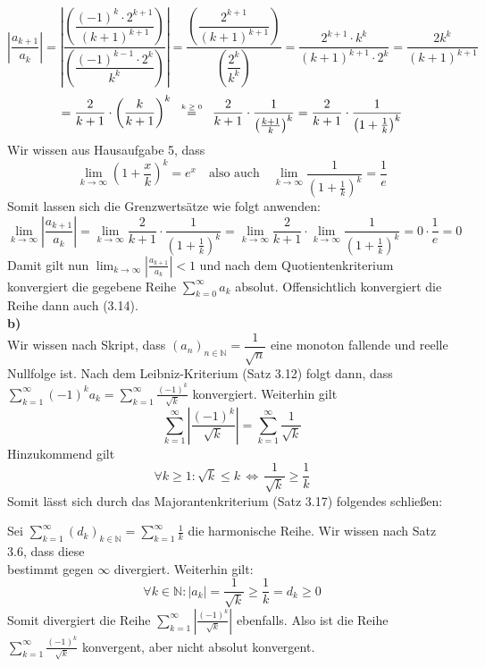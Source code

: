 \documentclass[a4paper,graphics,11pt]{article}
\newcommand{\up}[2]{\mathrel{\overset{\makebox[0pt]{\mbox{\normalfont\tiny #2}}}{#1}}}
\begin{document}
$$
    \left| \frac{a_{k+1}}{a_k}\right|
    = \left|\frac{\left(\dfrac{(-1)^k\cdot2^{k+1}}{(k+1)^{k+1}}\right)}{\left(\dfrac{(-1)^{k-1}\cdot 2^k}{k^k}\right)}\right|
    = \frac{\left(\dfrac{2^{k+1}}{(k+1)^{k+1}}\right)}{\left(\dfrac{2^k}{k^k}\right)}
    = \frac{2^{k+1}\cdot k^k}{(k+1)^{k+1} \cdot 2^k}
    = \frac{2k^k}{(k+1)^{k+1}}
$$$$
    =\frac{2}{k+1} \cdot \left(\frac{k}{k+1}\right)^k
    \quad\up{=}{$k\geq 0$}\quad \frac{2}{k+1} \cdot \frac{1}{\left(\frac{k+1}{k}\right)^k}
    = \frac{2}{k+1} \cdot \frac{1}{\left(1+\frac{1}{k}\right)^k}
$$
Wir wissen aus Hausaufgabe 5, dass
$$
    \lim_{k \to \infty} \left(1+\frac{x}{k}\right)^k = e^x\quad \text{also auch}\quad
    \lim_{k \to \infty} \frac{1}{\left(1+\frac{1}{k}\right)^k} = \frac{1}{e}
$$
Somit lassen sich die Grenzwertsätze wie folgt anwenden:
$$
    \lim_{k \to \infty} \left |\frac{a_{k+1}}{a_k}\right|
    = \lim_{k \to \infty} \frac{2}{k+1} \cdot \frac{1}{\left(1+\frac{1}{k}\right)^k}
    = \lim_{k \to \infty} \frac{2}{k+1} \cdot \lim_{k \to \infty} \frac{1}{\left(1+\frac{1}{k} \right)^k}
    = 0 \cdot \frac{1}{e} = 0
$$
Damit gilt nun $\lim_{k \to \infty}\limits \left|\frac{a_{k+1}}{a_k} \right| < 1$ und nach dem
Quotientenkriterium konvergiert die gegebene Reihe $\sum_{k=0}^{\infty} a_k$ absolut.
Offensichtlich konvergiert die Reihe dann auch (3.14).\\

\textbf{b)}\\[5pt]
Wir wissen nach Skript, dass
$(a_n)_{n\in \mathbb{N}} = \dfrac{1}{\sqrt{n}}$ eine monoton fallende und
reelle Nullfolge ist. Nach dem Leibniz-Kriterium (Satz 3.12) folgt dann, dass
$\displaystyle\sum_{k=1}^{\infty} (-1)^ka_k = \sum_{k=1}^{\infty} \frac{(-1)^k}{\sqrt{k}}$ konvergiert.
Weiterhin gilt
$$
    \sum_{k=1}^{\infty} \left|\frac{(-1)^k}{\sqrt{k}}\right|
    = \sum_{k=1}^{\infty} \frac{1}{\sqrt{k}}
$$
Hinzukommend gilt
$$
    \forall k \geq 1\colon \sqrt{k}\leq k \,\Longleftrightarrow\, \frac{1}{\sqrt{k}}\geq \frac{1}{k}
$$
Somit lässt sich durch das Majorantenkriterium (Satz 3.17) folgendes schließen:

Sei $\sum_{k=1}^{\infty} (d_k)_{k\in \mathbb{N}}= \sum_{k=1}^{\infty} \frac{1}{k}$
die harmonische Reihe. Wir wissen nach Satz 3.6, dass diese\\
bestimmt gegen $\infty$ divergiert.
Weiterhin gilt:
$$
    \forall k \in \mathbb{N}\colon |a_k| = \frac{1}{\sqrt{k}} \geq \frac{1}{k} = d_k \geq 0
$$
Somit divergiert die Reihe $\sum_{k=1}^{\infty}\left|\frac{(-1)^k}{\sqrt{k}}\right|$
ebenfalls. Also ist die Reihe $\sum_{k=1}^{\infty} \frac{(-1)^k}{\sqrt{k}}$ konvergent, aber nicht
absolut konvergent.
\end{document}
